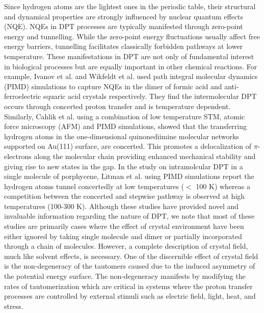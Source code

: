 Since hydrogen atoms are the lightest ones in the periodic table, their structural and dynamical properties are strongly influenced by nuclear quantum effects (NQE). NQEs in DPT processes are typically manifested through zero-point energy and tunnelling. While the zero-point energy fluctuations usually affect free energy barriers, tunnelling facilitates classically forbidden pathways at lower temperature. These manifestations in DPT are not only of fundamental interest in biological processes\cite{klinman} but are equally important in other chemical reactions\cite{nqerect, nqebio}. For example, Ivanov et al.\cite{ivanov2015quantum} and Wikfeldt et al.\cite{wikfeldt2014communication} used path integral molecular
dynamics (PIMD) simulations to capture NQEs in the dimer of formic acid and anti-ferroelectric squaric acid crystals respectively. They find the intermolecular DPT occurs through concerted proton transfer and is temperature dependent. Similarly, Cahlik et al.\cite{cahlik2021significance} using a combination of low temperature STM, atomic force microscopy (AFM) and PIMD simulations,  showed that the transferring hydrogen atoms in the one-dimensional quinonediimine molecular networks supported on Au(111) surface, are concerted. This promotes a delocalization of $\pi$-electrons along the molecular chain  providing enhanced mechanical stability and giving rise to new states in the gap. 
In the study on intramolcular DPT in a single molecule of porphycene,  Litman et al.\cite{porphycene_th} using PIMD simulations report the hydrogen atoms tunnel concertedly at low temperatures ($<$ 100 K) whereas a competition between the concerted and stepwise pathway is observed at high temperatures (100-300 K). Although these studies have provided novel and invaluable information regarding the nature of DPT, we note that most of these studies are primarily cases where the effect of crystal environment have been either ignored by taking single molecule and dimer or partially incorporated through a chain of molecules. However, a complete description of crystal field, much like solvent effects\cite{kwon2007double}, is necessary. One of the discernible effect of crystal field is the non-degeneracy of the tautomers caused due to the induced asymmetry of the potential energy surface.\cite{meier1982structure} The non-degeneracy manifests by modifying the rates of tautomerization which are critical in systems where the proton transfer processes are controlled by external stimuli such as electric field, light, heat, and stress\cite{wang2021stimuli}.

